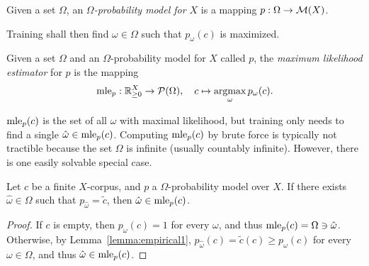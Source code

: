 \begin{definition}
 Given a set $\Omega$, an \emph{$\Omega$-probability model for $X$} is a mapping $p:\Omega\to\mathcal M(X)$.
\end{definition}

Training shall then find $\omega\in\Omega$ such that $p_\omega(c)$ is maximized.

\begin{definition}
 Given a set $\Omega$ and an $\Omega$-probability model for $X$ called $p$, the \emph{maximum likelihood estimator} for $p$ is the mapping
 \[
  \mle_p: \zr_{\geq0}^X \to \up(\Omega),
  \quad
  c \mapsto \argmax_\omega p_\omega(c).
 \]
\end{definition}

$\operatorname{mle}_p(c)$ is the set of all $\omega$ with maximal likelihood, but training only needs to find a single $\hat\omega \in \operatorname{mle}_p(c)$. Computing $\operatorname{mle}_p(c)$ by brute force is typically not tractible because the set $\Omega$ is infinite (usually countably infinite). However, there is one easily solvable special case.

\begin{lemma}\label{lemma:empirical2}
 Let $c$ be a finite $X$-corpus, and $p$ a $\Omega$-probability model over $X$. If there exists $\hat\omega\in\Omega$ such that $p_{\hat\omega} = \tilde c$, then $\hat\omega\in\operatorname{mle}_p(c)$.
\end{lemma}

\begin{proof}
 If $c$ is empty, then $p_\omega(c) = 1$ for every $\omega$, and thus $\operatorname{mle}_p(c) = \Omega \ni \hat\omega$. Otherwise, by Lemma~\ref{lemma:empirical1}, $p_{\hat\omega}(c) = \tilde c(c) \geq p_\omega(c)$ for every $\omega\in\Omega$, and thus $\hat\omega \in \operatorname{mle}_p(c)$.
\end{proof}
